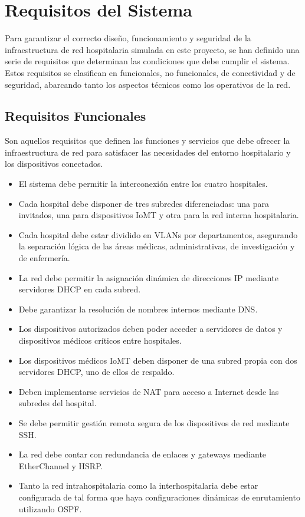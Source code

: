 \section{Requisitos del Sistema}
Para garantizar el correcto diseño, funcionamiento y seguridad de la infraestructura de red hospitalaria simulada en este proyecto, se han definido una serie de requisitos 
que determinan las condiciones que debe cumplir el sistema. Estos requisitos se clasifican en funcionales, no funcionales, de conectividad y de seguridad, abarcando tanto 
los aspectos técnicos como los operativos de la red.

\subsection{Requisitos Funcionales}
Son aquellos requisitos que definen las funciones y servicios que debe ofrecer la infraestructura de red para satisfacer las necesidades del entorno hospitalario y los 
dispositivos conectados.
\begin{itemize}
    \item El sistema debe permitir la interconexión entre los cuatro hospitales.
    \item Cada hospital debe disponer de tres subredes diferenciadas: una para invitados, una para dispositivos IoMT y otra para la red interna hospitalaria.
    \item Cada hospital debe estar dividido en VLANs por departamentos, asegurando la separación lógica de las áreas médicas, administrativas, de investigación y de enfermería.
    \item La red debe permitir la asignación dinámica de direcciones IP mediante servidores DHCP en cada subred.
    \item Debe garantizar la resolución de nombres internos mediante DNS.
    \item Los dispositivos autorizados deben poder acceder a servidores de datos y dispositivos médicos críticos entre hospitales.
    \item Los dispositivos médicos IoMT deben disponer de una subred propia con dos servidores DHCP, uno de ellos de respaldo.
    \item Deben implementarse servicios de NAT para acceso a Internet desde las subredes del hospital.
    \item Se debe permitir gestión remota segura de los dispositivos de red mediante SSH.
    \item La red debe contar con redundancia de enlaces y gateways mediante EtherChannel y HSRP.
    \item Tanto la red intrahospitalaria como la interhospitalaria debe estar configurada de tal forma que haya configuraciones dinámicas de enrutamiento utilizando OSPF.
\end{itemize}
